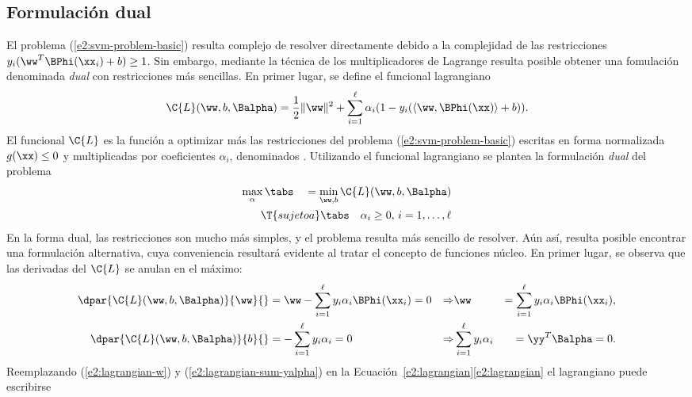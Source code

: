 \subsection{Formulación dual}
%
El problema (\ref{e2:svm-problem-basic}) resulta complejo de resolver
directamente debido a la complejidad de las restricciones
${y}_i(\ww^T\BPhi(\xx_i)+b)\geq{}1$. Sin embargo, mediante la técnica
de los multiplicadores de Lagrange \cite{LAGRANGE} \cite{bottou}
resulta posible obtener una fomulación denominada \emph{dual} con
restricciones más sencillas.
En primer lugar, se define el funcional lagrangiano
%
\begin{align}\label{e2:lagrangian}
  \C{L}(\ww,b,\Balpha) = \frac{1}{2} \|\ww\|^2
  + \sum_{i=1}^{\ell} \alpha_i (1-y_i(\langle\ww,\BPhi(\xx)\rangle+b)).
\end{align}
%
El funcional $\C{L}$ es la función a optimizar más las restricciones
del problema (\ref{e2:svm-problem-basic}) escritas en forma
normalizada $g(\xx)\leq0$ y multiplicadas por coeficientes $\alpha_i$,
denominados . Utilizando el funcional
lagrangiano se plantea la formulación \emph{dual} del problema
%
\begin{align}\label{e2:svm-problem-dual}
  \begin{split}
    \max_\alpha \tabs\quad = \min_{\ww,b} \C{L}(\ww,b,\Balpha)\\
    \T{sujeto a} \tabs\quad \alpha_i \geq 0,\, i=1,\ldots,\ell
  \end{split}
\end{align}
%
En la forma dual, las restricciones son mucho más simples, y el problema
resulta más sencillo de resolver. Aún así, resulta posible encontrar una
formulación alternativa, cuya conveniencia resultará evidente
al tratar el concepto de funciones núcleo. En primer lugar, se observa que
las derivadas del $\C{L}$ se anulan en el máximo:
%
\begin{align}\label{e2:lagrangian-w}
  \dpar{\C{L}(\ww,b,\Balpha)}{\ww}{}
    &=\ww-\sum_{i=1}^\ell y_i\alpha_i\BPhi(\xx_i) = 0
    &\Rightarrow& \ww &= \sum_{i=1}^\ell y_i\alpha_i\BPhi(\xx_i),
  \\
  \label{e2:lagrangian-sum-yalpha}
  \dpar{\C{L}(\ww,b,\Balpha)}{b}{}
    &=-\sum_{i=1}^\ell y_i\alpha_i = 0
      &\Rightarrow& \sum_{i=1}^\ell y_i\alpha_i &= \yy^T\Balpha = 0.
\end{align}
%
Reemplazando (\ref{e2:lagrangian-w}) y (\ref{e2:lagrangian-sum-yalpha})
en la \iflatexml{}Ecuación~\ref{e2:lagrangian}\else\autoref{e2:lagrangian}\fi
el lagrangiano puede escribirse
